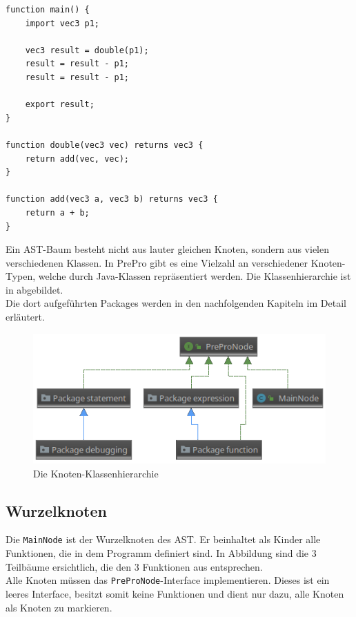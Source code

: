 \begin{lstlisting}[language=prepro, label={lst:AST_Example}, caption={PrePro-Code für den beispielhaften AST}, captionpos=b]
function main() {
    import vec3 p1;

    vec3 result = double(p1);
    result = result - p1;
    result = result - p1;

    export result;
}

function double(vec3 vec) returns vec3 {
    return add(vec, vec);
}

function add(vec3 a, vec3 b) returns vec3 {
    return a + b;
}
\end{lstlisting}
Ein \ac{AST}-Baum besteht nicht aus lauter gleichen Knoten, sondern aus vielen verschiedenen Klassen.
In PrePro gibt es eine Vielzahl an verschiedener Knoten-Typen, welche durch Java-Klassen repräsentiert werden.
Die Klassenhierarchie ist in  abgebildet.\\
Die dort aufgeführten Packages werden in den nachfolgenden Kapiteln im Detail erläutert.

\begin{figure}[H]
	\centering
	\includegraphics[width=\textwidth]{figures/uml_nodes}
	\caption{Die Knoten-Klassenhierarchie}
	\label{fig:NodesHierachy}
\end{figure}

\subsection{Wurzelknoten}
Die \texttt{MainNode} ist der Wurzelknoten des \ac{AST}.
Er beinhaltet als Kinder alle Funktionen, die in dem Programm definiert sind.
In Abbildung  sind die 3 Teilbäume ersichtlich, die den 3 Funktionen aus  entsprechen.\\
Alle Knoten müssen das \texttt{PreProNode}-Interface implementieren.
Dieses ist ein leeres Interface, besitzt somit keine Funktionen und dient nur dazu, alle Knoten als Knoten zu markieren.

